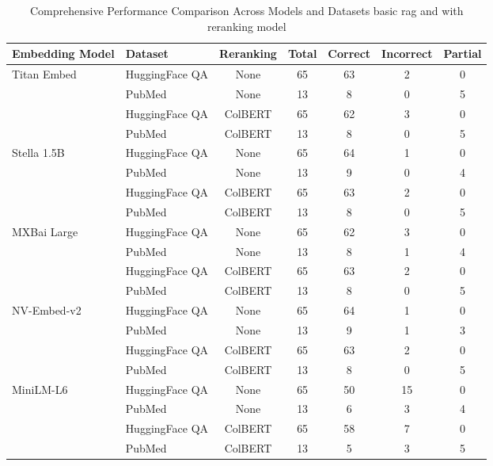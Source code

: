 \documentclass{scrartcl}
\begin{document}
\begin{table}[H]
    \centering
    \caption{Comprehensive Performance Comparison Across Models and Datasets basic rag and with reranking model}
    \small
    \begin{tabular}{llccccc}
    \hline
    Embedding Model & Dataset & Reranking & Total & Correct & Incorrect & Partial \\
    \hline
    \multirow{2}{*}{Titan Embed} & HuggingFace QA & None & 65 & 63 & 2 & 0 \\
    & PubMed & None & 13 & 8 & 0 & 5 \\
    \cline{2-7}
    & HuggingFace QA & ColBERT & 65 & 62 & 3 & 0 \\
    & PubMed & ColBERT & 13 & 8 & 0 & 5 \\
    \hline
    \multirow{2}{*}{Stella 1.5B} & HuggingFace QA & None & 65 & 64 & 1 & 0 \\
    & PubMed & None & 13 & 9 & 0 & 4 \\
    \cline{2-7}
    & HuggingFace QA & ColBERT & 65 & 63 & 2 & 0 \\
    & PubMed & ColBERT & 13 & 8 & 0 & 5 \\
    \hline
    \multirow{2}{*}{MXBai Large} & HuggingFace QA & None & 65 & 62 & 3 & 0 \\
    & PubMed & None & 13 & 8 & 1 & 4 \\
    \cline{2-7}
    & HuggingFace QA & ColBERT & 65 & 63 & 2 & 0 \\
    & PubMed & ColBERT & 13 & 8 & 0 & 5 \\
    \hline
    \multirow{2}{*}{NV-Embed-v2} & HuggingFace QA & None & 65 & 64 & 1 & 0 \\
    & PubMed & None & 13 & 9 & 1 & 3 \\
    \cline{2-7}
    & HuggingFace QA & ColBERT & 65 & 63 & 2 & 0 \\
    & PubMed & ColBERT & 13 & 8 & 0 & 5 \\
    \hline
    \multirow{2}{*}{MiniLM-L6} & HuggingFace QA & None & 65 & 50 & 15 & 0 \\
    & PubMed & None & 13 & 6 & 3 & 4 \\
    \cline{2-7}
    & HuggingFace QA & ColBERT & 65 & 58 & 7 & 0 \\
    & PubMed & ColBERT & 13 & 5 & 3 & 5 \\
    \hline
    \end{tabular}
    \label{tab:comprehensive_results}
\end{table}
\end{document}
